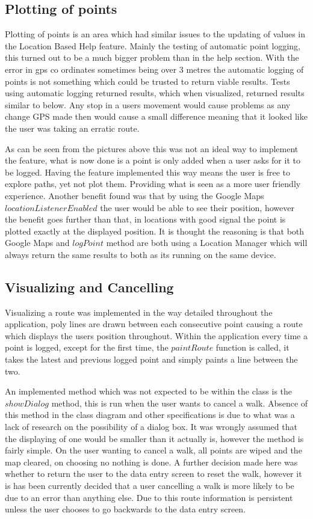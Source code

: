\subsection{Plotting of points}
Plotting of points is an area which had similar issues to the updating of values in the Location Based Help feature. Mainly the testing of automatic point logging, this turned out to be a much bigger problem than in the help section. With the error in gps co ordinates sometimes being over 3 metres the automatic logging of points is not something which could be trusted to return viable results. Tests using automatic logging returned results, which when visualized, returned results similar to below. Any stop in a users movement would cause problems as any change GPS made then would cause a small difference meaning that it looked like the user was taking an erratic route.

As can be seen from the pictures above this was not an ideal way to implement the feature, what is now done is a point is only added when a user asks for it to be logged. Having the feature implemented this way means the user is free to explore paths, yet not plot them. Providing what is seen as a more user friendly experience. Another benefit found was that by using the Google Maps $locationListenerEnabled$ the user would be able to see their position, however the benefit goes further than that, in locations with good signal the point is plotted exactly at the displayed position. It is thought the reasoning is that both Google Maps and $logPoint$ method are both using a Location Manager which will always return the same results to both as its running on the same device.
\subsection{Visualizing and Cancelling}
Visualizing a route was implemented in the way detailed throughout the application, poly lines are drawn between each consecutive point causing a route which displays the users position throughout. Within the application every time a point is logged, except for the first time, the $paintRoute$ function is called, it takes the latest and previous logged point and simply paints a line between the two.

An implemented method which was not expected to be within the class is the $showDialog$ method, this is run when the user wants to cancel a walk. Absence of this method in the class diagram and other specifications is due to what was a lack of research on the possibility of a dialog box. It was wrongly assumed that the displaying of one would be smaller than it actually is, however the method is fairly simple. On the user wanting to cancel a walk, all points are wiped and the map cleared, on choosing no nothing is done. A further decision made here was whether to return the user to the data entry screen to reset the walk, however it is has been currently decided that a user cancelling a walk is more likely to be due to an error than anything else. Due to this route information is persistent unless the user chooses to go backwards to the data entry screen. 


